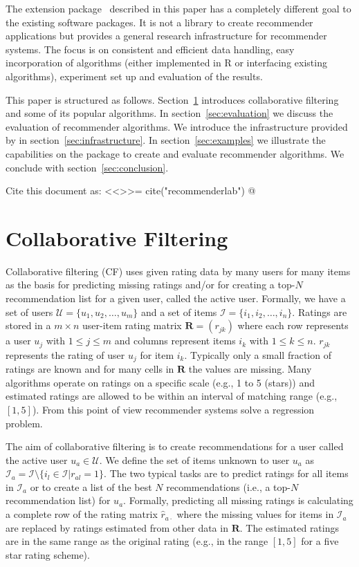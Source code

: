\documentclass[nojss]{jss}
\newcommand{\set}[1]{\mathcal{#1}}
\newcommand{\mat}[1]{{\mathbf{#1}}}
\begin{document}
The  extension package~
described in this paper
has a completely different goal to the existing software packages. It
is not a library to create recommender applications
but provides a general research infrastructure for recommender systems.
The focus is on consistent and efficient data handling,
easy incorporation of algorithms (either implemented in R or
interfacing existing algorithms),
experiment set up and evaluation of the results.

This paper is structured as follows. Section~\ref{sec:CF} introduces
collaborative filtering and
some of its popular algorithms.
In section~\ref{sec:evaluation} we discuss the evaluation of recommender
algorithms.
We introduce the infrastructure provided by 
in section~\ref{sec:infrastructure}. In section~\ref{sec:examples} we
illustrate the capabilities on the package to create and evaluate
recommender algorithms. We conclude with section~\ref{sec:conclusion}.

Cite this document as:
<<>>=
cite("recommenderlab")
@

\section{Collaborative Filtering}
\label{sec:CF}

Collaborative filtering (CF) uses given rating data by many users for many
items as the basis for predicting missing ratings and/or for creating
a top-$N$ recommendation list for a given user, called the active user.
Formally, we have a set of
users $\set{U} = \{u_1, u_2, \ldots, u_m\}$ and a set of
items $\set{I} = \{i_1, i_2, \ldots, i_n\}$.
Ratings are stored in a $m \times n$ user-item rating matrix $\mat{R} = (r_{jk})$ where
each row represents a user $u_j$ with $1 \le j\le m$ and columns represent
items $i_k$ with $1 \le k\le n$. $r_{jk}$ represents the rating of user
$u_j$ for item $i_k$.
Typically only a small fraction of ratings are
known and for many cells in $\mat{R}$ the values are missing.
Many algorithms operate on ratings on a specific scale (e.g., 1 to 5 (stars))
and estimated ratings are allowed to be within an interval of matching range
(e.g., $[1,5]$). From this point of view recommender systems solve a regression
problem.

The aim of collaborative filtering is to create recommendations for a user
called the active user $u_a \in \set{U}$.
We define the set of items unknown to user $u_a$ as
$\set{I}_a = \set{I} \setminus \{i_l \in \set{I}| r_{al} = 1\}$.
The two typical tasks are to predict
ratings for all items in $\set{I}_a$ or to create a list of
the best $N$ recommendations
(i.e., a top-$N$ recommendation list) for
$u_a$.
Formally, predicting all missing ratings is calculating a complete row of the
rating matrix $\hat{r}_{a\cdot}$ where the missing values
for items in $\set{I}_a$
are replaced by ratings estimated from other data in $\mat{R}$.
The estimated ratings are in the same range as the original rating
(e.g., in the range $[1,5]$ for a five star rating scheme).
\end{document}
